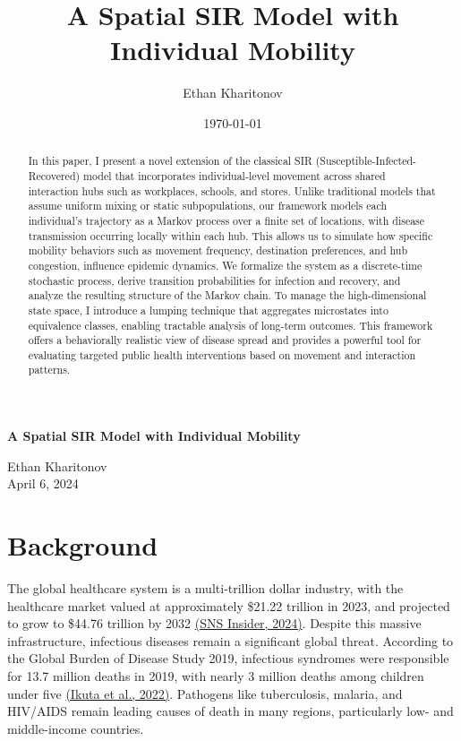 \documentclass[a4paper]{article}
\title{A Spatial SIR Model with Individual Mobility}
\author{Ethan Kharitonov}
\date{\today}
\begin{document}
	\begin{titlepage}
		\centering
		{\LARGE \bfseries A Spatial SIR Model with Individual Mobility\\[1.5em]}
		
		
		{\large Ethan Kharitonov\\ April 6, 2024}
		\begin{abstract}
			In this paper, I present a novel extension of the classical SIR (Susceptible-Infected-Recovered) model that incorporates individual-level movement across shared interaction hubs such as workplaces, schools, and stores. Unlike traditional models that assume uniform mixing or static subpopulations, our framework models each individual’s trajectory as a Markov process over a finite set of locations, with disease transmission occurring locally within each hub. This allows us to simulate how specific mobility behaviors such as movement frequency, destination preferences, and hub congestion, influence epidemic dynamics. We formalize the system as a discrete-time stochastic process, derive transition probabilities for infection and recovery, and analyze the resulting structure of the Markov chain. To manage the high-dimensional state space, I introduce a lumping technique that aggregates microstates into equivalence classes, enabling tractable analysis of long-term outcomes. This framework offers a behaviorally realistic view of disease spread and provides a powerful tool for evaluating targeted public health interventions based on movement and interaction patterns.
		\end{abstract}
	\end{titlepage}
	\tableofcontents
	\newpage
	\newcommand{\R}{\mathbb{R}}
	\newcommand{\Q}{\mathbb{Q}}
	\newcommand{\Z}{\mathbb{Z}}
	\newcommand{\N}{\mathbb{N}}
	\renewcommand{\P}{\mathcal{P}}
	\newcommand{\D}{\mathcal{D}}
	\newcommand{\C}{\mathbb{C}}
	\newcommand{\Tr}{\text{T}}
	\renewcommand{\L}{\mathcal{L}}
	\newcommand{\A}{\mathcal{A}}
	\newcommand{\sign}{\text{sign}\;}
	\renewcommand{\null}{\text{null}}
	\newcommand{\match}{\text{match}}
	\newcommand{\OPT}{\text{OPT}}
	\section{Background}
	The global healthcare system is a multi-trillion dollar industry, with the healthcare market valued at approximately \$21.22 trillion in 2023, and projected to grow to \$44.76 trillion by 2032 \href{https://www.globenewswire.com/news-release/2024/08/01/2923001/0/en/Healthcare-Market-Size-Worth-US-44-760-73-Billion-By-2032-Continuous-Advancements-in-Biotechnology-Pharmaceuticals-Propels-Growth-Research-by-SNS-Insider.html}{(SNS Insider, 2024)}. Despite this massive infrastructure, infectious diseases remain a significant global threat. According to the Global Burden of Disease Study 2019, infectious syndromes were responsible for 13.7 million deaths in 2019, with nearly 3 million deaths among children under five \href{https://www.thelancet.com/journals/lancet/article/PIIS0140-6736(22)02185-7/fulltext}{(Ikuta et al., 2022)}. Pathogens like tuberculosis, malaria, and HIV/AIDS remain leading causes of death in many regions, particularly low- and middle-income countries.
	
\end{document}

